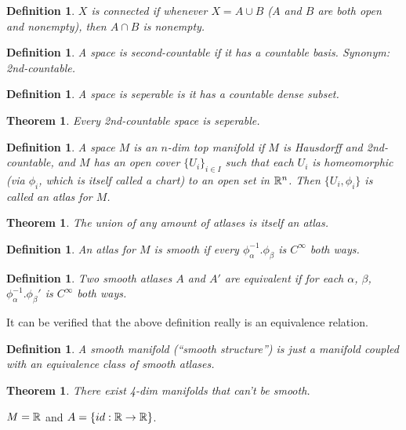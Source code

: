\documentclass[11pt]{amsbook}
\theoremstyle{mystyle} \newtheorem{thrm}[thm]{Theorem}
\theoremstyle{mystyle} \newtheorem{defi}[thm]{Definition}
\theoremstyle{mystyle} \newtheorem{coro}[thm]{Corollary}
\theoremstyle{mystyle} \newtheorem{propo}[thm]{Proposition}
\theoremstyle{mystyle} \newtheorem{lemm}[thm]{Lemma}
\numberwithin{thm}{section}
\newcommand{\de}{\emph}
\begin{document}
\begin{defi}
	$X$ is \de{connected} if whenever $X = A \cup B$ ($A$ and $B$ are both open and nonempty), then $A \cap B$ is nonempty.
\end{defi}

\begin{defi}
	A space is \de{second-countable} if it has a countable basis.  Synonym: \de{2nd-countable}.
\end{defi}
\begin{defi}
	A space is \de{seperable} is it has a countable dense subset.
\end{defi}
\begin{thrm}
	Every 2nd-countable space is seperable.
\end{thrm}
\begin{defi}
	A space $M$ is an $n$-dim top \de{manifold} if $M$ is Hausdorff and 2nd-countable, and $M$ has an open cover $\{U_i\}_{i \in I}$ such that each $U_i$ is homeomorphic (via $\phi_i$, which is itself called a \de{chart}) to an open set in ${\mathbb R}^n$.  Then $\{ U_i, \phi_i \}$ is called an \de{atlas} for $M$.
\end{defi}
\begin{thrm}
	The union of any amount of atlases is itself an atlas.
\end{thrm}

\begin{defi}
	An atlas for $M$ is \de{smooth} if every $\phi_\alpha^{-1}.\phi_\beta$ is $C^\infty$ both ways.
\end{defi}

\begin{defi}
	Two smooth atlases $A$ and $A'$ are \de{equivalent} if for each $\alpha$, $\beta$, $\phi_\alpha^{-1}.\phi_\beta'$ is $C^\infty$ both ways.
\end{defi}
\begin{rmk}
	It can be verified that the above definition really is an equivalence relation.
\end{rmk}

\begin{defi}
	A \de{smooth} manifold (``smooth structure'') is just a manifold coupled with an equivalence class of smooth atlases.
\end{defi}

\begin{thrm}
	There exist 4-dim manifolds that can't be smooth.
\end{thrm}



\begin{example}
	$M = {\mathbb R}$ and $A = \{ id: {\mathbb R} \to {\mathbb R} \}$.
\end{example}
\end{document}
